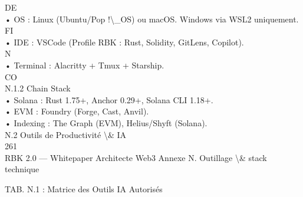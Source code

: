 \documentclass[12pt,landscape,a4paper]{article}
\begin{document}
\vspace{0.5em}
\vspace{0.5em}
\vspace{0.5em}
DE\\
• OS : Linux (Ubuntu/Pop !\textbackslash{}_OS) ou macOS. Windows via WSL2 uniquement.\\
\vspace{0.5em}
\vspace{0.5em}
\vspace{0.5em}
\vspace{0.5em}
FI\\
• IDE : VSCode (Profile RBK : Rust, Solidity, GitLens, Copilot).\\
\vspace{0.5em}
\vspace{0.5em}
\vspace{0.5em}
N\\
• Terminal : Alacritty + Tmux + Starship.\\
CO\\
N.1.2 Chain Stack\\
• Solana : Rust 1.75+, Anchor 0.29+, Solana CLI 1.18+.\\
\vspace{0.5em}
• EVM : Foundry (Forge, Cast, Anvil).\\
\vspace{0.5em}
• Indexing : The Graph (EVM), Helius/Shyft (Solana).\\
\vspace{0.5em}
\vspace{0.5em}
\vspace{0.5em}
N.2 Outils de Productivité \textbackslash{}& IA\\
\vspace{0.5em}
\vspace{0.5em}
261\\
RBK 2.0 — Whitepaper Architecte Web3                                                                   Annexe N. Outillage \textbackslash{}& stack technique\\
\vspace{0.5em}
\vspace{0.5em}
\vspace{0.5em}
\vspace{0.5em}
\begin{center}\begin{tabular}TAB. N.1 : Matrice des Outils IA Autorisés\end{tabular}\end{center}
\vspace{0.5em}
\end{document}
